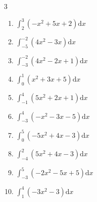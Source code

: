 \begin{multicols}{3}
\begin{enumerate}
  \item $\displaystyle \int_{2}^{3}\left( -x^{2}+5x+2 \right) \mathrm{d}x$


  \item $\displaystyle \int_{-5}^{-2}\left( 4x^{2}-3x \right) \mathrm{d}x$


  \item $\displaystyle \int_{-3}^{-2}\left( 4x^{2}-2x+1 \right) \mathrm{d}x$


\columnbreak %

  \item $\displaystyle \int_{0}^{1}\left( x^{2}+3x+5 \right) \mathrm{d}x$


  \item $\displaystyle \int_{-1}^{4}\left( 5x^{2}+2x+1 \right) \mathrm{d}x$


  \item $\displaystyle \int_{-3}^{4}\left( -x^{2}-3x-5 \right) \mathrm{d}x$


  \item $\displaystyle \int_{0}^{5}\left( -5x^{2}+4x-3 \right) \mathrm{d}x$


  \item $\displaystyle \int_{-4}^{2}\left( 5x^{2}+4x-3 \right) \mathrm{d}x$

        \phantom{$\displaystyle =93$}

\columnbreak %

\resetques

  \item $\displaystyle \int_{-3}^{5}\left( -2x^{2}-5x+5 \right) \mathrm{d}x$


  \item $\displaystyle \int_{1}^{4}\left( -3x^{2}-3 \right) \mathrm{d}x$



\end{enumerate}
\end{multicols}
